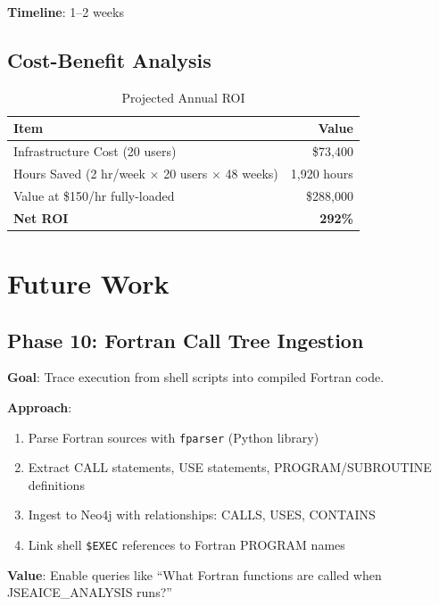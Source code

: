 \documentclass[11pt,letterpaper]{article}
\begin{document}
\textbf{Timeline}: 1--2 weeks

\subsection{Cost-Benefit Analysis}

\begin{table}[H]
\centering
\caption{Projected Annual ROI}
\begin{tabular}{@{}lr@{}}
\toprule
\textbf{Item} & \textbf{Value} \\
\midrule
Infrastructure Cost (20 users) & \$73,400 \\
Hours Saved (2 hr/week $\times$ 20 users $\times$ 48 weeks) & 1,920 hours \\
Value at \$150/hr fully-loaded & \$288,000 \\
\textbf{Net ROI} & \textbf{292\%} \\
\bottomrule
\end{tabular}
\end{table}

\section{Future Work}

\subsection{Phase 10: Fortran Call Tree Ingestion}

\textbf{Goal}: Trace execution from shell scripts into compiled Fortran code.

\textbf{Approach}:
\begin{enumerate}
    \item Parse Fortran sources with \texttt{fparser} (Python library)
    \item Extract CALL statements, USE statements, PROGRAM/SUBROUTINE definitions
    \item Ingest to Neo4j with relationships: CALLS, USES, CONTAINS
    \item Link shell \texttt{\$EXEC} references to Fortran PROGRAM names
\end{enumerate}

\textbf{Value}: Enable queries like ``What Fortran functions are called when JSEAICE\_ANALYSIS runs?''
\end{document}
